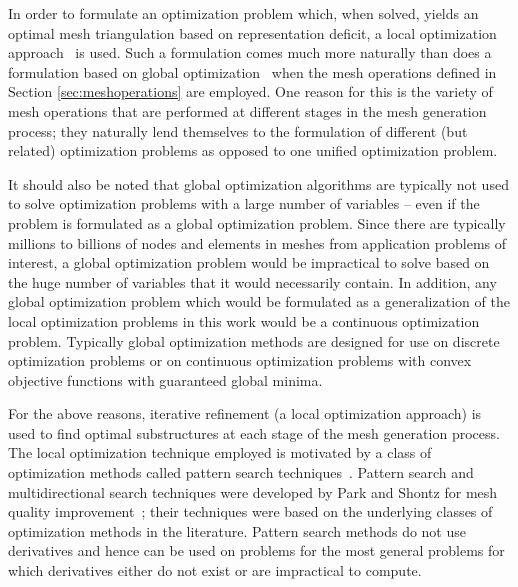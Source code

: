 In order to formulate an optimization problem which, when solved, yields 
an optimal mesh triangulation based on representation deficit, a local 
optimization approach~\cite{nocedal_wright_book} is used. Such a 
formulation comes much more naturally than does a formulation based on 
global optimization~\cite{global_optimization_book} when the 
mesh operations defined in Section \ref{sec:meshoperations} are 
employed. One reason for this is the variety of mesh operations that are 
performed at different stages in the mesh generation process; they 
naturally lend themselves to the formulation of different (but related) 
optimization problems as opposed to one unified optimization problem.

It should also be noted that global optimization algorithms are typically 
not used to solve optimization problems with a large number of variables 
-- even if the problem is formulated as a global optimization problem. 
Since there are typically millions to billions of nodes and elements in 
meshes from application problems of interest, a global optimization 
problem would be impractical to solve based on the huge number of 
variables that it would necessarily contain. In addition, any global 
optimization 
problem which would be formulated as a generalization of the local 
optimization problems in this work would be a continuous optimization 
problem. Typically global optimization methods are designed for use on 
discrete optimization problems or on continuous optimization problems with 
convex objective functions with guaranteed global minima.

For the above reasons, iterative refinement (a local optimization 
approach) is used to find optimal substructures at each stage of the mesh 
generation process. The local optimization technique employed is
motivated by a class of optimization methods called pattern search 
techniques~\cite{patternsearch1}. Pattern search and multidirectional 
search techniques were developed by Park and Shontz for mesh quality 
improvement~\cite{patternsearch4}; their techniques were based on the 
underlying classes of optimization methods in the literature. Pattern 
search methods do not use derivatives and hence can be used on problems for 
the most general problems for which derivatives either do not exist or are 
impractical to compute.


